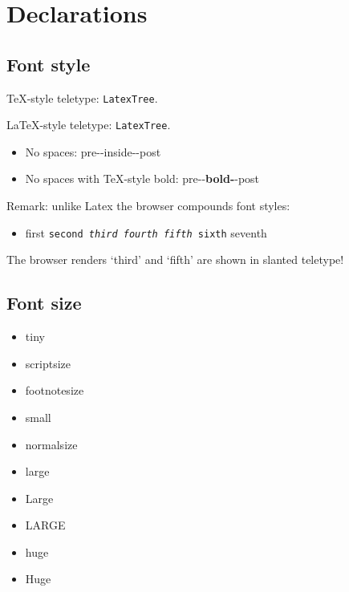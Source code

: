 \documentclass[12pt]{article}
\theoremstyle{plain}
\theoremstyle{definition}
\theoremstyle{remark}
\theoremstyle{mystyle}
\begin{document}
\section{Declarations}

\subsection{Font style}
\label{ss:font-style-dec}

TeX-style teletype: {\tt LatexTree}.
\par
LaTeX-style teletype: \texttt{LatexTree}.

\begin{itemize}
\item No spaces: pre-{-inside-}-post
\item No spaces with TeX-style bold: pre-{-\bf bold-}-post
\end{itemize}

Remark: unlike Latex the browser compounds font styles:
\begin{itemize}
\item 
first {\tt second {\it third {\sc fourth} fifth} sixth} seventh
\end{itemize}
The browser renders `third' and `fifth' are shown in slanted teletype!

\subsection{Font size}
\label{ss:font-size-dec}

\begin{itemize}
\item \tiny tiny
\item \scriptsize scriptsize
\item \footnotesize footnotesize
\item \small small
\item \normalsize normalsize
\item \large large
\item \Large Large
\item \LARGE LARGE
\item \huge huge
\item \Huge Huge
\end{itemize}
\normalsize

\end{document}
